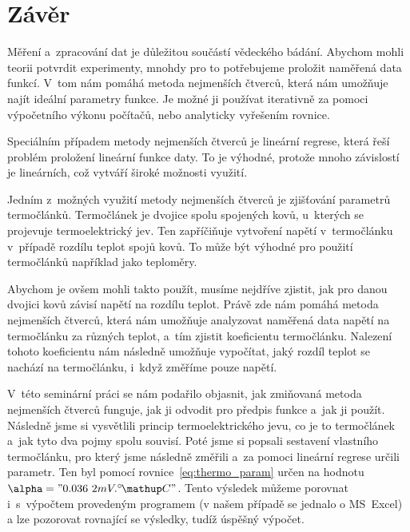\section{Závěr}
Měření a~zpracování dat je důležitou součástí vědeckého bádání. Abychom mohli
teorii potvrdit experimenty, mnohdy pro to potřebujeme proložit naměřená data
funkcí. V~tom nám pomáhá metoda nejmenších čtverců, která nám umožňuje najít
ideální parametry funkce. Je možné ji používat iterativně za pomoci výpočetního
výkonu počítačů, nebo analyticky vyřešením rovnice.

Speciálním případem metody nejmenších čtverců je lineární regrese, která řeší
problém proložení lineární funkce daty. To je výhodné, protože mnoho závislostí
je lineárních, což vytváří široké možnosti využití.

Jedním z~možných využití metody nejmenších čtverců je zjišťování parametrů
termočlánků. Termočlánek je dvojice spolu spojených kovů, u~kterých se
projevuje termoelektrický jev. Ten zapříčiňuje vytvoření napětí v~termočlánku
v~případě rozdílu teplot spojů kovů. To může být výhodné pro použití
termočlánků například jako teploměry. 

Abychom je ovšem mohli takto použít, musíme nejdříve zjistit, jak pro danou
dvojici kovů závisí napětí na rozdílu teplot. Právě zde nám pomáhá metoda
nejmenších čtverců, která nám umožňuje analyzovat naměřená data napětí na
termočlánku za různých teplot, a~tím zjistit koeficientu termočlánku.
Nalezení tohoto koeficientu nám následně umožňuje vypočítat, jaký rozdíl teplot
se nachází na termočlánku, i~když změříme pouze napětí.

V~této seminární práci se nám podařilo objasnit, jak zmiňovaná metoda
nejmenších čtverců funguje, jak ji odvodit pro předpis funkce a~jak ji použít.
Následně jsme si vysvětlili princip termoelektrického jevu, co je to
termočlánek a~jak tyto dva pojmy spolu souvisí. Poté jsme si popsali sestavení
vlastního termočlánku, pro který jsme následně změřili a~za pomoci lineární
regrese určili parametr. Ten byl pomocí rovnice~\ref{eq:thermo_param} určen
na hodnotu $\alpha="0.036~2 mV.\C"$. Tento výsledek můžeme porovnat
i~s~výpočtem provedeným programem (v našem případě se jednalo o MS~Excel) a
lze pozorovat rovnající se výsledky, tudíž úspěšný výpočet.

